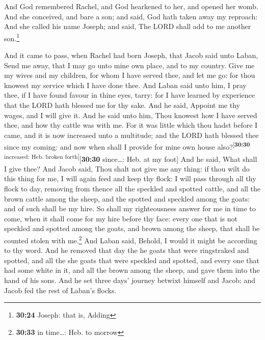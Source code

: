 And God remembered Rachel, and God hearkened to her, and
opened her womb.  And she conceived, and bare a son; and
said, God hath taken away my reproach:  And she called
his name Joseph; and said, The LORD shall add to me another
son.\footnote{\textbf{30:24} Joseph: that is, Adding}

 And it came to pass, when Rachel had born Joseph, that
Jacob said unto Laban, Send me away, that I may go unto mine own place,
and to my country.  Give me my wives and my children, for
whom I have served thee, and let me go: for thou knowest my service
which I have done thee.  And Laban said unto him, I pray
thee, if I have found favour in thine eyes, tarry: for I have learned by
experience that the LORD hath blessed me for thy sake. 
And he said, Appoint me thy wages, and I will give it. 
And he said unto him, Thou knowest how I have served thee, and how thy
cattle was with me.  For it was little which thou hadst
before I came, and it is now increased unto a multitude; and the LORD
hath blessed thee since my coming: and now when shall I provide for mine
own house also?\textsuperscript{{[}\textbf{30:30} increased: Heb. broken
forth{]}}{[}\textbf{30:30} since\ldots: Heb. at my foot{]}
 And he said, What shall I give thee? And Jacob said,
Thou shalt not give me any thing: if thou wilt do this thing for me, I
will again feed and keep thy flock:  I will pass through
all thy flock to day, removing from thence all the speckled and spotted
cattle, and all the brown cattle among the sheep, and the spotted and
speckled among the goats: and of such shall be my hire. 
So shall my righteousness answer for me in time to come, when it shall
come for my hire before thy face: every one that is not speckled and
spotted among the goats, and brown among the sheep, that shall be
counted stolen with me.\footnote{\textbf{30:33} in time\ldots: Heb. to
  morrow}  And Laban said, Behold, I would it might be
according to thy word.  And he removed that day the he
goats that were ringstraked and spotted, and all the she goats that were
speckled and spotted, and every one that had some white in it, and all
the brown among the sheep, and gave them into the hand of his sons.
 And he set three days' journey betwixt himself and
Jacob: and Jacob fed the rest of Laban's flocks.

